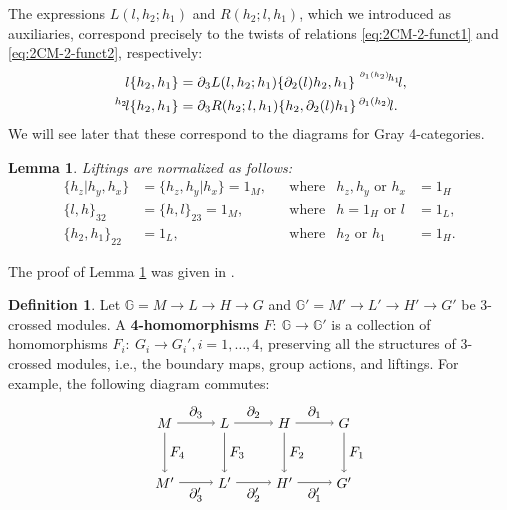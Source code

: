 \documentclass[11pt, reqno]{amsart} %
\newcommand{\act}[1]{\,\sp{#1}\!}
\newcommand{\bG}{{\mathbb{G}}}
\newtheorem{lemma}[theorem]{Lemma}
\theoremstyle{definition}
\newtheorem{definition}[theorem]{Definition}
\theoremstyle{remark}
\numberwithin{equation}{section}
\begin{document}
The expressions $L(l,h_2;h_1)$ and $R(h_2;l,h_1)$, which we introduced as auxiliaries, correspond precisely to the twists of relations \eqref{eq:2CM-2-funct1} and \eqref{eq:2CM-2-funct2}, respectively:
\begin{align}
  \label{eq:3CM-twisted-2funct1}
  l\{h_2,h_1\} &= \partial_3L(l,h_2;h_1)\{\partial_2(l)h_2,h_1\}\act{\act{\partial_1(h_2)}h_1}l, \\
  \label{eq:3CM-twisted-2funct2}
  \act{h_2}l\{h_2,h_1\} &= \partial_3R(h_2;l,h_1)\{h_2,\partial_2(l)h_1\}\act{\partial_1(h_2)}l.
\end{align}
We will see later that these correspond to the diagrams for Gray 4-categories.

\begin{lemma}\label{thm:unit}
Liftings are normalized as follows:
\begin{align*}
  \{h_z|h_y,h_x\} &= \{h_z,h_y|h_x\} = 1_M, & &\text{where} & h_z,h_y \text{ or } h_x &= 1_H \\
  \{l,h\}_{32} &= \{h,l\}_{23} = 1_M, & &\text{where} & h=1_H\text{ or } l&=1_L, \\
  \{h_2,h_1\}_{22} &= 1_L, & &\text{where} & h_2\text{ or } h_1&=1_H.
\end{align*}
\end{lemma}
The proof of Lemma \ref{thm:unit} was given in \cite{Fukuda:2025}.

\begin{definition}\label{def:3CM-hom}
Let $\bG = M\to L\to H\to G$ and $\bG'=M'\to L'\to H'\to G'$ be 3-crossed modules. A {\bf{4-homomorphisms}} $F:~\bG\to\bG'$ is a collection of homomorphisms $F_i:~G_i\to G_i', i=1,\ldots,4$, preserving all the structures of 3-crossed modules, i.e., the boundary maps, group actions, and liftings. For example, the following diagram commutes:
\[
  \begin{tikzpicture}
    \node (A1) at (0,0) {$M$};
    \node (B1) at (1.5,0) {$L$};
    \node (C1) at (3,0) {$H$};
    \node (D1) at (4.5,0) {$G$};
    \node (A2) at (0,-1.5) {$M'$};
    \node (B2) at (1.5,-1.5) {$L'$};
    \node (C2) at (3,-1.5) {$H'$};
    \node (D2) at (4.5,-1.5) {$G'$};
    \draw [->] (A1) to node [anchor=south] {$\partial_3$} (B1);
    \draw [->] (B1)  to node [anchor=south] {$\partial_2$} (C1);
    \draw [->] (C1)  to node [anchor=south] {$\partial_1$} (D1);
    \draw [->] (A2)  to node [anchor=north] {$\partial_3'$} (B2);
    \draw [->] (B2)  to node [anchor=north] {$\partial_2'$} (C2);
    \draw [->] (C2)  to node [anchor=north] {$\partial_1'$} (D2);
    \draw [->] (A1)  to node [anchor=west] {$F_4$} (A2);
    \draw [->] (B1) to node [anchor=west] {$F_3$} (B2);
    \draw [->] (C1) to node [anchor=west] {$F_2$} (C2);
    \draw [->] (D1) to node [anchor=west] {$F_1$} (D2);
  \end{tikzpicture}
\]
\end{definition}
\end{document}
